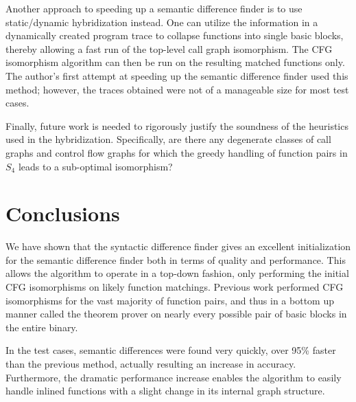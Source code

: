 \documentclass[11pt,twocolumn]{article}
\begin{document}
Another approach to speeding up a semantic difference finder is to use static/dynamic hybridization instead.  One can utilize the information in a dynamically created program trace to collapse functions into single basic blocks, thereby allowing a fast run of the top-level call graph isomorphism.  The CFG isomorphism algorithm can then be run on the resulting matched functions only.  The author's first attempt at speeding up the semantic difference finder used this method; however, the traces obtained were not of a manageable size for most test cases.

Finally, future work is needed to rigorously justify the soundness of the heuristics used in the hybridization.  Specifically, are there any degenerate classes of call graphs and control flow graphs for which the greedy handling of function pairs in $S_4$ leads to a sub-optimal isomorphism?


\section{Conclusions}

We have shown that the syntactic difference finder gives an excellent initialization for the semantic difference finder both in terms of quality and performance.  This allows the algorithm to operate in a top-down fashion, only performing the initial CFG isomorphisms on likely function matchings.  Previous work performed CFG isomorphisms for the vast majority of function pairs, and thus in a bottom up manner called the theorem prover on nearly every possible pair of basic blocks in the entire binary.  

In the test cases, semantic differences were found very quickly, over 95\% faster than the previous method, actually resulting an increase in accuracy. 
Furthermore, the dramatic performance increase enables the algorithm to easily handle inlined functions with a slight change in its internal graph structure.



\end{document}
